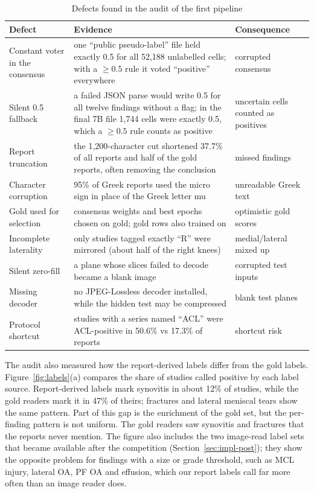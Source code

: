 \begin{table}[htbp]
\centering\footnotesize{}
\caption{Defects found in the audit of the first pipeline}
\label{tab:defects}
\begin{tabularx}{\textwidth}{L{3.9cm} Y L{2.6cm}}
\toprule
Defect & Evidence & Consequence \\
\midrule
Constant voter in the consensus & one ``public pseudo-label'' file held exactly 0.5 for all 52,188 unlabelled cells; with a $\geq0.5$ rule it voted ``positive'' everywhere & corrupted consensus \\
Silent 0.5 fallback & a failed JSON parse would write 0.5 for all twelve findings without a flag; in the final 7B file 1,744 cells were exactly 0.5, which a $\geq0.5$ rule counts as positive & uncertain cells counted as positives \\
Report truncation & the 1,200-character cut shortened 37.7\% of all reports and half of the gold reports, often removing the conclusion & missed findings \\
Character corruption & 95\% of Greek reports used the micro sign in place of the Greek letter mu & unreadable Greek text \\
Gold used for selection & consensus weights and best epochs chosen on gold; gold rows also trained on & optimistic gold scores \\
Incomplete laterality & only studies tagged exactly ``R'' were mirrored (about half of the right knees) & medial/lateral mixed up \\
Silent zero-fill & a plane whose slices failed to decode became a blank image & corrupted test inputs \\
Missing decoder & no JPEG-Lossless decoder installed, while the hidden test may be compressed & blank test planes \\
Protocol shortcut & studies with a series named ``ACL'' were ACL-positive in 50.6\% vs 17.3\% of reports & shortcut risk \\
\bottomrule
\end{tabularx}
\end{table}

The audit also measured how the report-derived labels differ from the gold labels. Figure~\ref{fig:labels}(a) compares the share of studies called positive by each label source. Report-derived labels mark synovitis in about 12\% of studies, while the gold readers mark it in 47\% of theirs; fractures and lateral meniscal tears show the same pattern. Part of this gap is the enrichment of the gold set, but the per-finding pattern is not uniform. The gold readers saw synovitis and fractures that the reports never mention. The figure also includes the two image-read label sets that became available after the competition (Section~\ref{sec:impl-post}); they show the opposite problem for findings with a size or grade threshold, such as MCL injury, lateral OA, PF OA and effusion, which our report labels call far more often than an image reader does.

